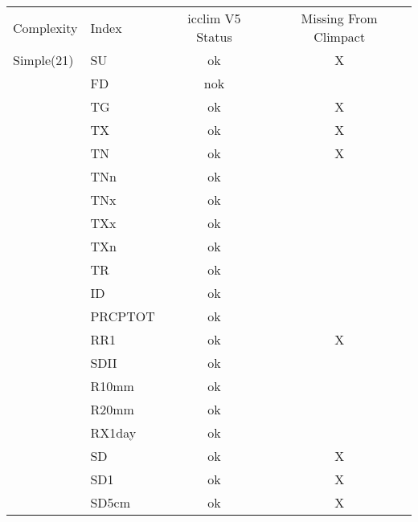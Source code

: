 \documentclass[a4paper,11pt]{article}
\begin{document}
    \begin{table}[h]
    \begin{tabular}{l l c c}
        Complexity   &  Index    & icclim V5 Status & Missing From Climpact \\
        Simple(21)   &  SU       &   ok             &          X            \\
                     &  FD       &   nok            &                       \\
                     &  TG       &   ok             &          X            \\
                     &  TX       &   ok             &          X            \\
                     &  TN       &   ok             &          X            \\
                     &  TNn      &   ok             &                       \\
                     &  TNx      &   ok             &                       \\
                     &  TXx      &   ok             &                       \\
                     &  TXn      &   ok             &                       \\
                     &  TR       &   ok             &                       \\
                     &  ID       &   ok             &                       \\
                     &  PRCPTOT  &   ok             &                       \\       
                     &  RR1      &   ok             &          X            \\
                     &  SDII     &   ok             &                       \\       
                     &  R10mm    &   ok             &                       \\       
                     &  R20mm    &   ok             &                       \\       
                     &  RX1day   &   ok             &                       \\       
                     &  SD       &   ok             &          X            \\
                     &  SD1      &   ok             &          X            \\   
                     &  SD5cm    &   ok             &          X            \\       

\end{tabular}
\end{table}
\end{document}
